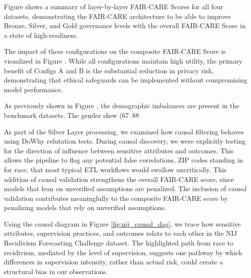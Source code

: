 Figure  shows a summary of layer-by-layer FAIR-CARE Scores for all four datasets, demonstrating the FAIR-CARE architecture to be able to improve Bronze, Silver, and Gold governance levels with the overall FAIR-CARE Score in a state of high-readiness.

The impact of these configurations on the composite FAIR-CARE Score is visualized in Figure . While all configurations maintain high utility, the primary benefit of Configs A and B is the substantial reduction in privacy risk, demonstrating that ethical safeguards can be implemented without compromising model performance.

As previously shown in Figure , the demographic imbalances are present in the benchmark datasets. The gender skew (67--88%

As part of the Silver Layer processing, we examined how causal filtering behaves using DoWhy refutation tests. During causal discovery, we were explicitly testing for the direction of influence between sensitive attributes and outcomes. This allows the pipeline to flag any potential false correlations, ZIP codes standing in for race, that most typical ETL workflows would swallow uncritically. This addition of causal validation strengthens the overall FAIR-CARE score, since models that lean on unverified assumptions are penalized. The inclusion of causal validation contributes meaningfully to the composite FAIR-CARE score by penalizing models that rely on unverified assumptions.

Using the causal diagram in Figure \ref {fig:nij_causal_dag}, we trace how sensitive attributes, supervision practices, and outcomes relate to each other in the NIJ Recidivism Forecasting Challenge dataset. The highlighted path from race to recidivism, mediated by the level of supervision, suggests one pathway by which differences in supervision intensity, rather than actual risk, could create a structural bias in our observations.

